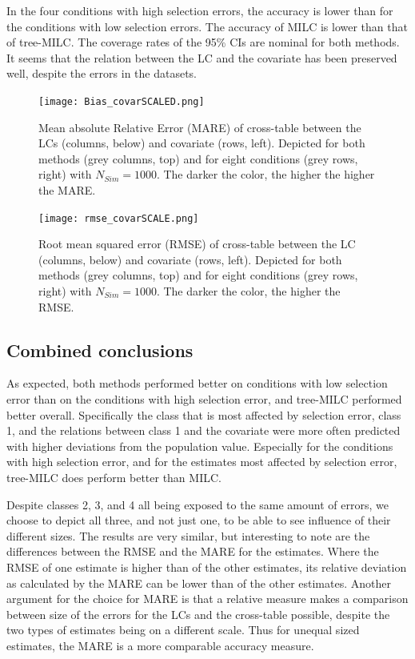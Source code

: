 \documentclass[a4paper, 11pt]{article} %
\begin{document}
In the four conditions with high selection errors, the accuracy is lower than for the conditions with low selection errors. The accuracy of MILC is lower than that of tree-MILC. The coverage rates of the 95\% CIs are nominal for both methods. It seems that the relation between the LC and the covariate has been preserved well, despite the errors in the datasets. 

\begin{figure}[h]
    \centering
    \texttt{[image: Bias\_covarSCALED.png]}
     \caption{Mean absolute Relative Error (MARE) of cross-table between the LCs (columns, below) and covariate (rows, left). Depicted for both methods (grey columns, top) and for eight conditions (grey rows, right) with $N_{Sim} = 1000$. The darker the color, the higher the higher the MARE.}
     \label{fig:biascovar}

   \texttt{[image: rmse\_covarSCALE.png]}
    \caption{Root mean squared error (RMSE) of cross-table between the LC (columns, below) and covariate (rows, left).  Depicted for both methods (grey columns, top) and for eight conditions (grey rows, right) with $N_{Sim} = 1000$. The darker the color, the higher the RMSE.}
    \label{fig:rmsecovar}
\end{figure}

\subsection{Combined conclusions}
As expected, both methods performed better on conditions with low selection error than on the conditions with high selection error, and tree-MILC performed better overall. Specifically the class that is most affected by selection error, class 1, and the relations between class 1 and the covariate were more often predicted with higher deviations from the population value. Especially for the conditions with high selection error, and for the estimates most affected by selection error, tree-MILC does perform better than MILC. 

Despite classes 2, 3, and 4 all being exposed to the same amount of errors, we choose to depict all three, and not just one, to be able to see influence of their different sizes.
The results are very similar, but interesting to note are the differences between the RMSE and the MARE for the estimates. Where the RMSE of one estimate is higher than of the other estimates, its relative deviation as calculated by the MARE can be lower than of the other estimates. Another argument for the choice for MARE is that a relative measure makes a comparison between size of the errors for the LCs and the cross-table possible, despite the two types of estimates being on a different scale. Thus for unequal sized estimates, the MARE is a more comparable accuracy measure. 
\end{document}
